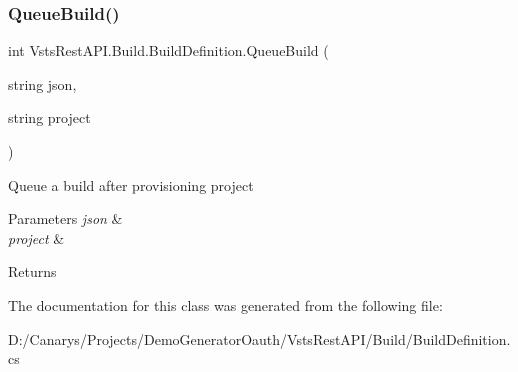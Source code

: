 \subsubsection{\texorpdfstring{Queue\+Build()}{QueueBuild()}}
{\footnotesize\ttfamily int Vsts\+Rest\+A\+P\+I.\+Build.\+Build\+Definition.\+Queue\+Build (\begin{DoxyParamCaption}\item[{string}]{json,  }\item[{string}]{project }\end{DoxyParamCaption})}



Queue a build after provisioning project 


\begin{DoxyParams}{Parameters}
{\em json} & \\
\hline
{\em project} & \\
\hline
\end{DoxyParams}
\begin{DoxyReturn}{Returns}

\end{DoxyReturn}


The documentation for this class was generated from the following file\+:\begin{DoxyCompactItemize}
\item 
D\+:/\+Canarys/\+Projects/\+Demo\+Generator\+Oauth/\+Vsts\+Rest\+A\+P\+I/\+Build/Build\+Definition.\+cs\end{DoxyCompactItemize}
